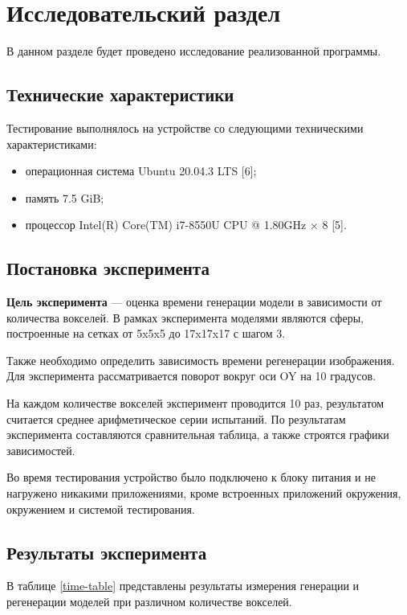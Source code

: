 \chapter{Исследовательский раздел}
В данном разделе будет проведено исследование реализованной программы.

\section{Технические характеристики}
Тестирование выполнялось на устройстве со следующими техническими характеристиками:
\begin{itemize}
	\item операционная система Ubuntu 20.04.3 LTS [6];
	\item память 7.5 GiB;
	\item процессор Intel(R) Core(TM) i7-8550U CPU @ 1.80GHz × 8 [5].
\end{itemize}

\section{Постановка эксперимента}

\textbf{Цель эксперимента} --- оценка времени генерации модели в зависимости от количества вокселей. В рамках эксперимента моделями являются сферы, построенные на сетках от 5x5x5 до 17x17x17 с шагом 3.

Также необходимо определить зависимость времени регенерации изображения. Для эксперимента рассматривается поворот вокруг оси OY на 10 градусов.

На каждом количестве вокселей эксперимент проводится 10 раз, результатом считается среднее арифметическое серии испытаний. По результатам эксперимента составляются сравнительная табли­ца, а также строятся графики зависимостей.

Во время тестирования устройство было подключено к блоку питания и не нагружено никакими приложениями, кроме встроенных приложений окружения, окружением и системой тестирования.

\section{Результаты эксперимента}

В таблице \ref{time-table} представлены результаты измерения генерации и регенерации моделей при различном количестве вокселей.

